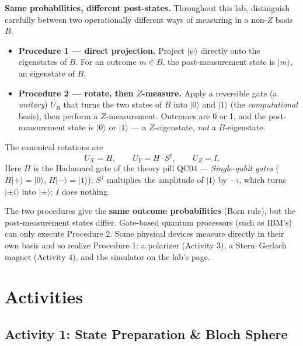 \documentclass[a4paper,11pt]{article}
\newcommand{\keepspace}[1]{\par\vspace{0pt plus #1}\penalty-300\vspace{0pt plus -#1}}
\providecommand{\ket}[1]{|{#1}\rangle}
\begin{document}
\begin{procedurebox}
\textbf{Same probabilities, different post-states.} Throughout this lab, distinguish
carefully between two operationally different ways of measuring in a non-$Z$ basis $B$:
\begin{itemize}
    \item \textbf{Procedure 1 --- direct projection.} Project $\ket{\psi}$ directly onto
          the eigenstates of $B$. For an outcome $m \in B$, the post-measurement state is
          $\ket{m}$, an eigenstate of $B$.
    \item \textbf{Procedure 2 --- rotate, then $Z$-measure.} Apply a reversible gate (a
          \emph{unitary}) $U_B$ that turns the two states of $B$ into $\ket{0}$ and
          $\ket{1}$ (the \emph{computational} basis), then perform a $Z$-measurement.
          Outcomes are 0 or 1, and the post-measurement state is $\ket{0}$ or $\ket{1}$
          --- a $Z$-eigenstate, \emph{not} a $B$-eigenstate.
\end{itemize}
The canonical rotations are
\[
    U_X = H, \qquad U_Y = H \cdot S^\dagger, \qquad U_Z = I .
\]
Here $H$ is the Hadamard gate of the theory pill QC04 --- \textit{Single-qubit gates}
($H\ket{+} = \ket{0}$, $H\ket{-} = \ket{1}$); $S^\dagger$ multiplies the amplitude of
$\ket{1}$ by $-i$, which turns $\ket{\pm i}$ into $\ket{\pm}$; $I$ does nothing.

\medskip
The two procedures give the \textbf{same outcome probabilities} (Born rule), but the
post-measurement states differ. Gate-based quantum processors (such as IBM's) can only
execute Procedure 2. Some physical devices measure directly in their own basis and so
realize Procedure 1: a polarizer (Activity 3), a Stern--Gerlach magnet (Activity 4), and
the simulator on the lab's page.
\end{procedurebox}

\keepspace{10\baselineskip}
\section{Activities}

\subsection{Activity 1: State Preparation \& Bloch Sphere}
\end{document}
